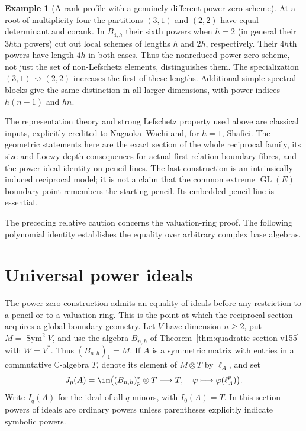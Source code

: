 \documentclass[11pt,reqno]{amsart}
\numberwithin{equation}{section}
\theoremstyle{definition}\newtheorem{definition}[theorem]{Definition}
\newtheorem{example}[theorem]{Example}
\theoremstyle{remark}\newtheorem{remark}[theorem]{Remark}
\newcommand{\C}{\mathbb C}\newcommand{\Q}{\mathbb Q}
\DeclareMathOperator{\Sym}{Sym}\DeclareMathOperator{\Gr}{Gr}
\begin{document}
\begin{example}[A rank profile with a genuinely different power-zero scheme]
\label{ex:power-profile-v155}
At a root of multiplicity four the partitions $(3,1)$ and $(2,2)$
have equal determinant and corank.  In $B_{4,h}$ their sixth powers
when $h=2$ (in general their $3h$th powers) cut out local schemes
of lengths $h$ and $2h$, respectively.  Their $4h$th powers have
length $4h$ in both cases.  Thus the nonreduced power-zero scheme,
not just the set of non-Lefschetz elements, distinguishes them.
The specialization $(3,1)\rightsquigarrow(2,2)$ increases the first
of these lengths.  Additional simple spectral blocks give the
same distinction in all larger dimensions, with power indices
$h(n-1)$ and $hn$.
\end{example}

The representation theory and strong Lefschetz property used above
are classical inputs, explicitly credited to Nagaoka--Wachi and,
for $h=1$, Shafiei.  The geometric statements here are the exact
section of the whole reciprocal family, its size and Loewy-depth
consequences for actual first-relation boundary fibres, and the
power-ideal identity on pencil lines.  The last construction is an
intrinsically induced reciprocal model; it is not a claim that the
common extreme $\operatorname{GL}(E)$ boundary point remembers the
starting pencil.  Its embedded pencil line is essential.

The preceding relative caution concerns the valuation-ring proof. The following polynomial identity establishes the equality over arbitrary complex base algebras.

\section{Universal power ideals}
\label{sec:universal-power-v157}
The power-zero construction admits an equality of ideals before any
restriction to a pencil or to a valuation ring. This is the point at
which the reciprocal section acquires a global boundary geometry.
Let $V$ have dimension $n\geq2$, put $M=\Sym^2V$, and use the algebra
$B_{n,h}$ of Theorem~\ref{thm:quadratic-section-v155} with $W=V^*$.
Thus $(B_{n,h})_1=M$. If $A$ is a symmetric matrix with entries in a
commutative $\C$-algebra $T$, denote its element of $M\otimes T$ by
$\ell_A$, and set
\begin{equation}\label{eq:universal-power-definition-v157}
 J_p(A)=\im\bigl((B_{n,h})_p^*\otimes T\longrightarrow T,
                  \quad\varphi\longmapsto\varphi(\ell_A^p)\bigr).
\end{equation}
Write $I_q(A)$ for the ideal of all $q$-minors, with $I_0(A)=T$.
In this section powers of ideals are ordinary powers unless parentheses
explicitly indicate symbolic powers.
\end{document}
